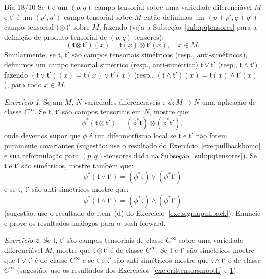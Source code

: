 \documentclass[oneside,11pt]{amsart}
\theoremstyle{remark}\newtheorem{exercise}{Exercício}[section]
\theoremstyle{plain}\newtheorem{teo}{Teorema}[section]
\theoremstyle{plain}\newtheorem{lem}[teo]{Lema}
\theoremstyle{plain}\newtheorem{prop}[teo]{Proposição}
\theoremstyle{definition}\newtheorem{defin}[teo]{Definição}
\theoremstyle{remark}\newtheorem{rem}[teo]{Observação}
\theoremstyle{definition}\newtheorem{example}[teo]{Exemplo}
\numberwithin{equation}{section}
\begin{document}
\begin{section}{Dia 18/10}
Se $\mathfrak t$ é um $(p,q)$-campo tensorial sobre uma variedade diferenciável $M$ e $\mathfrak t'$ é um $(p',q')$-campo tensorial sobre $M$
então definimos um $(p+p',q+q')$-campo tensorial $\mathfrak t\otimes\mathfrak t'$
sobre $M$, fazendo (veja a Subseção~\ref{sub:pqtensores} para a definição de produto tensorial de $(p,q)$-tensores):
\[(\mathfrak t\otimes\mathfrak t')(x)=\mathfrak t(x)\otimes\mathfrak t'(x),\quad x\in M.\]
Similarmente, se $\mathfrak t$, $\mathfrak t'$ são campos tensoriais simétricos (resp., an\-ti-si\-mé\-tri\-cos), definimos um campo tensorial
simétrico (resp., anti-simétrico) $\mathfrak t\vee\mathfrak t'$ (resp., $\mathfrak t\wedge\mathfrak t'$) fazendo
$(\mathfrak t\vee\mathfrak t')(x)=\mathfrak t(x)\vee\mathfrak t'(x)$ (resp., $(\mathfrak t\wedge\mathfrak t')(x)=\mathfrak t(x)\wedge\mathfrak t'(x)$),
para todo $x\in M$.

\begin{exercise}\label{exe:pullbacktensfield}
Sejam $M$, $N$ variedades diferenciáveis e $\phi:M\to N$ uma aplicação de classe $C^\infty$. Se $\mathfrak t$, $\mathfrak t'$ são campos tensoriais em $N$, mostre
que:
\[\phi^*(\mathfrak t\otimes\mathfrak t')=(\phi^*\mathfrak t)\otimes(\phi^*\mathfrak t'),\]
onde devemos supor que $\phi$ é um difeomorfismo local se $\mathfrak t$ e $\mathfrak t'$ não forem puramente covariantes (sugestão: use o resultado do
Exercício~\ref{exe:pullbackhomo} e sua reformulação para $(p,q)$-tensores dada na Subseção~\ref{sub:pqtensores}).
Se $\mathfrak t$ e $\mathfrak t'$ são simétricos, mostre também que:
\[\phi^*(\mathfrak t\vee\mathfrak t')=(\phi^*\mathfrak t)\vee(\phi^*\mathfrak t')\]
e se $\mathfrak t$, $\mathfrak t'$ são anti-simétricos
mostre que:
\[\phi^*(\mathfrak t\wedge\mathfrak t')=(\phi^*\mathfrak t)\wedge(\phi^*\mathfrak t')\]
(sugestão: use o resultado do item~(d) do Exercício~\ref{exe:sigmapullback}).
Enuncie e prove os resultados análogos para o push-forward.
\end{exercise}

\begin{exercise}
Se $\mathfrak t$, $\mathfrak t'$ são campos tensoriais de classe $C^\infty$ sobre uma variedade diferenciável $M$, mostre que $\mathfrak t\otimes\mathfrak t'$
é de classe $C^\infty$. Se $\mathfrak t$ e $\mathfrak t'$ são simétricos mostre que $\mathfrak t\vee\mathfrak t'$ é de classe $C^\infty$ e
se $\mathfrak t$ e $\mathfrak t'$ são anti-simétricos mostre que $\mathfrak t\wedge\mathfrak t'$ é de classe $C^\infty$ (sugestão: use os resultados
dos Exercícios~\ref{exe:crittensorsmooth} e \ref{exe:pullbacktensfield}).
\end{exercise}


\end{section}
\end{document}
